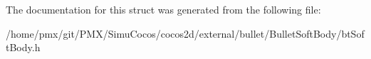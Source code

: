 The documentation for this struct was generated from the following file\+:\begin{DoxyCompactItemize}
\item 
/home/pmx/git/\+P\+M\+X/\+Simu\+Cocos/cocos2d/external/bullet/\+Bullet\+Soft\+Body/bt\+Soft\+Body.\+h\end{DoxyCompactItemize}
